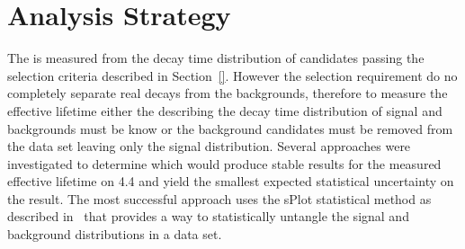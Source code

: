 \section{Analysis Strategy}
\label{sec:fitstrategy}


The \bsmumu \el is measured from the decay time distribution of \bsmumu candidates passing the selection criteria described in Section~\ref{}. However the selection requirement do no completely separate real \bsmumu decays from the backgrounds, therefore to measure the \bsmumu effective lifetime either the \pdfs describing the decay time distribution of signal and backgrounds must be know or the background candidates must be removed from the data set leaving only the signal distribution. Several approaches were investigated to determine which would produce stable results for the measured \bsmumu effective lifetime on 4.4 \fb and yield the smallest expected statistical uncertainty on the result. The most successful approach uses the sPlot statistical method as described in~\cite{Pivk:2004ty} that provides a way to statistically untangle the signal and background distributions in a data set.


